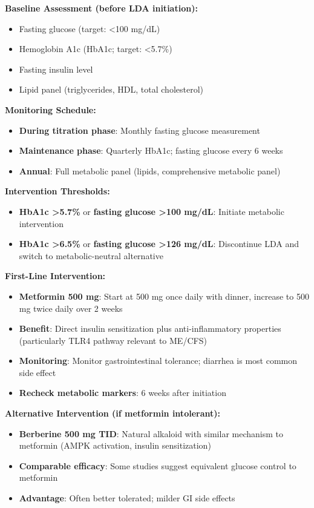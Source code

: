 \begin{protocol}
\label{prot:lda-metabolic-protection}

\textbf{Baseline Assessment (before LDA initiation):}
\begin{itemize}
    \item Fasting glucose (target: <100 mg/dL)
    \item Hemoglobin A1c (HbA1c; target: <5.7\%)
    \item Fasting insulin level
    \item Lipid panel (triglycerides, HDL, total cholesterol)
\end{itemize}

\textbf{Monitoring Schedule:}
\begin{itemize}
    \item \textbf{During titration phase}: Monthly fasting glucose measurement
    \item \textbf{Maintenance phase}: Quarterly HbA1c; fasting glucose every 6 weeks
    \item \textbf{Annual}: Full metabolic panel (lipids, comprehensive metabolic panel)
\end{itemize}

\textbf{Intervention Thresholds:}
\begin{itemize}
    \item \textbf{HbA1c >5.7\%} or \textbf{fasting glucose >100 mg/dL}: Initiate metabolic intervention
    \item \textbf{HbA1c >6.5\%} or \textbf{fasting glucose >126 mg/dL}: Discontinue LDA and switch to metabolic-neutral alternative
\end{itemize}

\textbf{First-Line Intervention:}
\begin{itemize}
    \item \textbf{Metformin 500 mg}: Start at 500 mg once daily with dinner, increase to 500 mg twice daily over 2 weeks
    \item \textbf{Benefit}: Direct insulin sensitization plus anti-inflammatory properties (particularly TLR4 pathway relevant to ME/CFS)
    \item \textbf{Monitoring}: Monitor gastrointestinal tolerance; diarrhea is most common side effect
    \item \textbf{Recheck metabolic markers}: 6 weeks after initiation
\end{itemize}

\textbf{Alternative Intervention (if metformin intolerant):}
\begin{itemize}
    \item \textbf{Berberine 500 mg TID}: Natural alkaloid with similar mechanism to metformin (AMPK activation, insulin sensitization)
    \item \textbf{Comparable efficacy}: Some studies suggest equivalent glucose control to metformin
    \item \textbf{Advantage}: Often better tolerated; milder GI side effects
\end{itemize}


\end{protocol}
